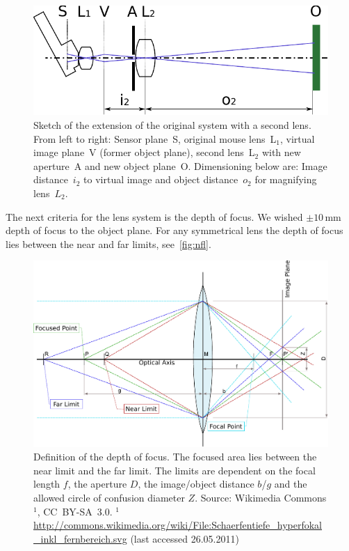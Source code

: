 \documentclass[12pt,a4paper]{article}
\begin{document}
\begin{figure}[htbp]
\begin{center}
\includegraphics[width=1\columnwidth]{figures/sketch-optic-2lens}
\caption{\label{fig:sk2l}
Sketch of the extension of the original system with a second lens.
From left to right: 
Sensor plane~S,
original mouse lens~L$_1$, 
virtual image plane~V (former object plane),
second lens~L$_2$ with new aperture~A and
new object plane~O.
Dimensioning below are: 
Image distance~$i_2$ to virtual image and object distance~$o_2$ for magnifying lens~$L_2$. %
}
\end{center}
\end{figure}

The next criteria for the lens system is the depth of focus.
We wished $\pm 10$\,mm depth of focus to the object plane.
For any symmetrical lens the depth of focus lies between the near and far limits, see~\autoref{fig:nfl}.

\begin{figure}[htbp]
\includegraphics[width=1\columnwidth]{figures/near_farpoints}
\caption{\label{fig:nfl}
Definition of the depth of focus.
The focused area lies between the near limit and the far limit.
The limits are dependent on the focal length $f$, the aperture $D$, the image/object distance $b$/$g$ and the allowed circle of confusion diameter $Z$.
\newline
Source: Wikimedia Commons$^1$, CC~BY-SA~3.0.
\newline
\newline
$^1$ \url{http://commons.wikimedia.org/wiki/File:Schaerfentiefe_hyperfokal_inkl_fernbereich.svg} (last accessed 26.05.2011)
}
\end{figure}
\end{document}
